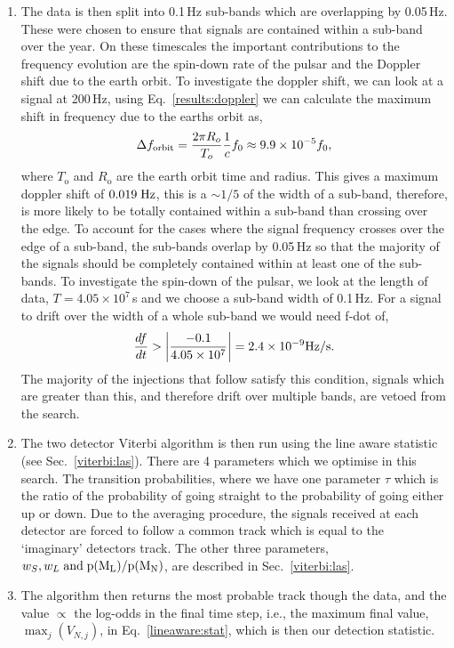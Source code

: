\begin{enumerate}
\item The data is then split into 0.1\,Hz sub-bands which are overlapping by 0.05\,Hz. These were chosen to ensure that signals are contained within a sub-band over the year. On these timescales the important contributions to the frequency evolution are the spin-down rate of the pulsar and the Doppler shift due to the earth orbit.
To investigate the doppler shift, we can look at a signal at 200\,Hz, using Eq.~\ref{results:doppler} we can calculate the maximum shift in frequency due to the earths orbit as,
%
\begin{equation}
\label{viterbi:results:dforbit}
\Delta f_{\rm orbit} = \frac{2 \pi R_o}{T_o} \frac{1}{c} f_0 \approx 9.9 \times 10^{-5} f_0,
\end{equation}
%
where $T_{\text{o}}$ and $R_{\text{o}}$ are the
earth orbit time and radius. This gives a maximum doppler shift of $0.019 \; \rm{Hz}$, this is a $\sim 1/5$ of the width of a sub-band, therefore, is more likely to be totally contained within a sub-band than crossing over the edge.
To account for the cases where the signal frequency crosses over the edge of a sub-band, the sub-bands overlap by 0.05\,Hz so that the majority of the signals should be completely contained within at least one of the sub-bands.
To investigate the spin-down of the pulsar, we look at the length of data, $T=4.05 \times 10^7$\,s and we choose a sub-band width of 0.1\,Hz. For a signal to drift over the width of a whole sub-band we would need f-dot of,
\begin{equation}
\frac{df}{dt} > \left|\frac{-0.1}{4.05 \times 10^7}\right| = 2.4 \times 10^{-9} \rm{Hz/s}.
\end{equation}
The majority of the injections that follow satisfy this condition, signals which are greater than this, and therefore drift over multiple bands, are vetoed from the search.
%
\item The two detector Viterbi algorithm is then run using the line aware
statistic (see Sec.~\ref{viterbi:las}). There are 4 parameters which we optimise in this search. The transition probabilities, where we have one parameter $\tau$ which is the ratio of the probability
of going straight to the probability of going either up or down. Due to the averaging
procedure, the signals received at each detector are forced to follow a common track which is equal to the `imaginary' detectors track. The other three parameters, $w_S, w_L \; \rm{and} \; p(M_L)/p(M_N)$, are described in Sec.~\ref{viterbi:las}.
%
\item The algorithm then returns the most probable track though the data, and the value
$\propto$ the log-odds in the final time step, i.e., the
maximum final value, $\max_j(V_{N,j})$, in Eq.~\ref{lineaware:stat}, which is then our detection statistic.

%
\end{enumerate}
